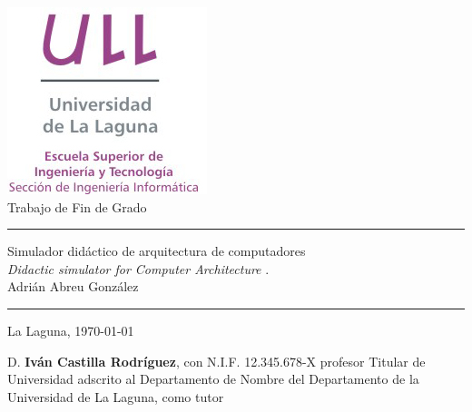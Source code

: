 \documentclass[spanish,a4paper,14pt,oneside]{extreport}
\begin{document}

\pagestyle{empty}
\thispagestyle{empty}


\newcommand{\HRule}{\rule{\linewidth}{1mm}}
\setlength{\parindent}{0mm}
\setlength{\parskip}{0mm}


\begin{center}
\includegraphics[scale=0.8]{images/logo_vertical}\\[10mm]
{\Huge Trabajo de Fin de Grado}
\end{center}

\HRule
\begin{flushright}
        {\Huge Simulador didáctico de arquitectura de computadores} \\[2.5mm]
        {\Large \textit{Didactic simulator for Computer Architecture} .} \\[5mm]
        {\Large Adrián Abreu González} \\[5mm]


\end{flushright}
\HRule
{}
\begin{center}
  \Large La Laguna, \today
\end{center}

\setlength{\parindent}{5mm}

\newpage
\thispagestyle{empty}

D. {\bf Iván Castilla Rodríguez}, con N.I.F. 12.345.678-X
profesor
Titular de Universidad
adscrito al Departamento
de Nombre del Departamento
de la Universidad de La Laguna, como tutor
\end{document}

